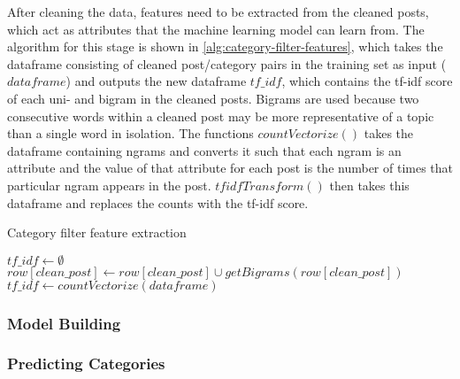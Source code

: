 After cleaning the data, features need to be extracted from the cleaned posts, which act as attributes that the machine learning model can learn from. The algorithm for this stage is shown in \ref{alg:category-filter-features}, which takes the dataframe consisting of cleaned post/category pairs in the training set as input ($dataframe$) and outputs the new dataframe $tf\_idf$, which contains the tf-idf score of each uni- and bigram in the cleaned posts. Bigrams are used because two consecutive words within a cleaned post may be more representative of a topic than a single word in isolation. The functions $countVectorize()$ takes the dataframe containing ngrams and converts it such that each ngram is an attribute and the value of that attribute for each post is the number of times that particular ngram appears in the post. $tfidfTransform()$ then takes this dataframe and replaces the counts with the tf-idf score.

\begin{algorithm}
\caption{Category filter feature extraction}
\label{alg:category-filter-features}
\begin{algorithmic}[1]
\State $tf\_idf\gets \emptyset$
	\State $row[clean\_post]\gets row[clean\_post]\cup getBigrams(row[clean\_post])$
\EndFor
\State $tf\_idf\gets countVectorize(dataframe)$
\State {}
\end{algorithmic}
\end{algorithm}

\subsubsection{Model Building}


\subsubsection{Predicting Categories}